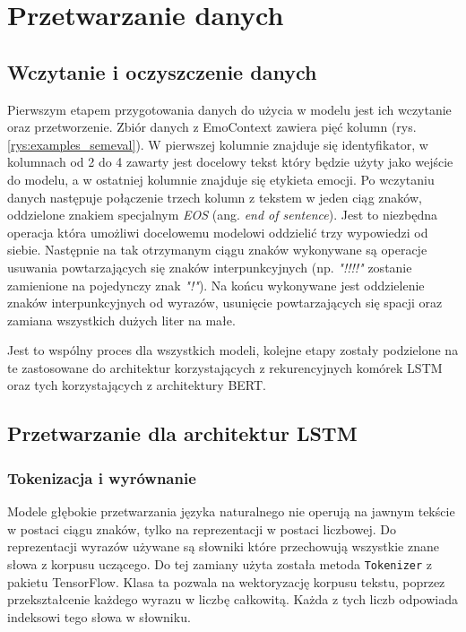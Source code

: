 \chapter{Przetwarzanie danych}
\label{chapter:przetwarzanie_danych}

\section{Wczytanie i oczyszczenie danych}

Pierwszym etapem przygotowania danych do użycia w modelu jest ich wczytanie oraz przetworzenie. Zbiór danych z EmoContext zawiera pięć kolumn (rys. \ref{rys:examples_semeval}). W pierwszej kolumnie znajduje się identyfikator, w kolumnach od 2 do 4 zawarty jest docelowy tekst który będzie użyty jako wejście do modelu, a w ostatniej kolumnie znajduje się etykieta emocji. Po wczytaniu danych następuje połączenie trzech kolumn z tekstem w jeden ciąg znaków, oddzielone znakiem specjalnym \textit{EOS} (ang. \textit{end of sentence}). Jest to niezbędna operacja która umożliwi docelowemu modelowi oddzielić trzy wypowiedzi od siebie. Następnie na tak otrzymanym ciągu znaków wykonywane są operacje usuwania powtarzających się znaków interpunkcyjnych (np. \textit{"!!!!"} zostanie zamienione na pojedynczy znak \textit{"!"}). Na końcu wykonywane jest oddzielenie znaków interpunkcyjnych od wyrazów, usunięcie powtarzających się spacji oraz zamiana wszystkich dużych liter na małe.

Jest to wspólny proces dla wszystkich modeli, kolejne etapy zostały podzielone na te zastosowane do architektur korzystających z rekurencyjnych komórek LSTM oraz tych korzystających z architektury BERT. 

\section{Przetwarzanie dla architektur LSTM}

\subsection{Tokenizacja i wyrównanie}

Modele głębokie przetwarzania języka naturalnego nie operują na jawnym tekście w postaci ciągu znaków, tylko na reprezentacji w postaci liczbowej. Do reprezentacji wyrazów używane są słowniki które przechowują wszystkie znane słowa z korpusu uczącego. Do tej zamiany użyta została metoda \texttt{Tokenizer} z pakietu TensorFlow. Klasa ta pozwala na wektoryzację korpusu tekstu, poprzez przekształcenie każdego wyrazu w liczbę całkowitą. Każda z tych liczb odpowiada indeksowi tego słowa w słowniku.

